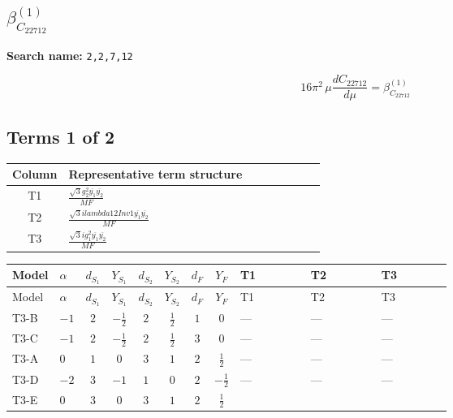 \documentclass[8pt]{article}
\begin{document}
\begin{landscape}
\section*{$\beta_{C_{22712}}^{(1)}$}
\noindent\textbf{Search name: }\texttt{2,2,7,12}\par\smallskip
\[16\pi^2\,\mu\frac{d C_{22712}}{d\mu}=\beta_{C_{22712}}^{(1)}\]
\subsection*{Terms 1 of 2}
\begin{center}
\begin{tabular}{@{}c >{\raggedright\arraybackslash}p{0.82\linewidth}@{}}
\toprule
Column & Representative term structure \\
\midrule
T1 & \(\displaystyle \frac{\sqrt{3} g_{2}^{2} \overline{y_{1}} \overline{y_{2}}}{MF}\) \\
\midrule
T2 & \(\displaystyle \frac{\sqrt{3} i lambda12Inv1 \overline{y_{1}} \overline{y_{2}}}{MF}\) \\
\midrule
T3 & \(\displaystyle \frac{\sqrt{3} i g_{1}^{2} \overline{y_{1}} \overline{y_{2}}}{MF}\) \\
\midrule
\bottomrule
\end{tabular}
\end{center}
\smallskip
\tiny
\begin{longtable}{@{}llcccccc >{\raggedright\arraybackslash}p{0.21\linewidth} >{\raggedright\arraybackslash}p{0.21\linewidth} >{\raggedright\arraybackslash}p{0.21\linewidth}@{}}
\toprule
Model & $\alpha$ & $d_{S_1}$ & $Y_{S_1}$ & $d_{S_2}$ & $Y_{S_2}$ & $d_F$ & $Y_F$ & T1 & T2 & T3 \\
\midrule
\endfirsthead
\toprule
Model & $\alpha$ & $d_{S_1}$ & $Y_{S_1}$ & $d_{S_2}$ & $Y_{S_2}$ & $d_F$ & $Y_F$ & T1 & T2 & T3 \\
\midrule
\endhead
T3-B & $-1$ & $2$ & $-\frac{1}{2}$ & $2$ & $\frac{1}{2}$ & $1$ & $0$ & --- & --- & --- \\
\midrule
T3-C & $-1$ & $2$ & $-\frac{1}{2}$ & $2$ & $\frac{1}{2}$ & $3$ & $0$ & --- & --- & --- \\
\midrule
T3-A & $0$ & $1$ & $0$ & $3$ & $1$ & $2$ & $\frac{1}{2}$ & --- & --- & --- \\
\midrule
T3-D & $-2$ & $3$ & $-1$ & $1$ & $0$ & $2$ & $-\frac{1}{2}$ & --- & --- & --- \\
\midrule
T3-E & $0$ & $3$ & $0$ & $3$ & $1$ & $2$ & $\frac{1}{2}$ & \scriptsize\adjustbox{max width=\linewidth}{$\begin{gathered} \frac{\sqrt{3} g_{2}^{2} \overline{y_{1}} \overline{y_{2}}}{6 MF}\end{gathered}$} & \scriptsize\adjustbox{max width=\linewidth}{$\begin{gathered} - \frac{\sqrt{3} i lambda12Inv1 \overline{y_{1}} \overline{y_{2}}}{6 MF}\end{gathered}$} & \scriptsize\adjustbox{max width=\linewidth}{$\begin{gathered} \frac{\sqrt{3} i g_{1}^{2} \overline{y_{1}} \overline{y_{2}}}{8 MF}\end{gathered}$} \\

\end{longtable}
\end{landscape}
\end{document}
